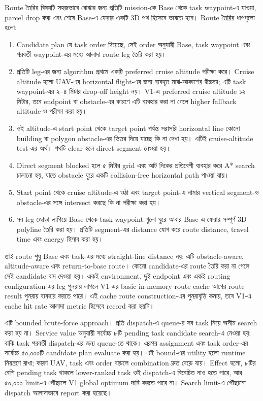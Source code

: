\documentclass[10pt,a4paper]{article}
\begin{document}
Route তৈরির বিষয়টি সহজভাবে বোঝার জন্য প্রতিটি mission-কে Base থেকে task waypoint-এ যাওয়া, parcel drop করা এবং শেষে Base-এ ফেরার একটি 3D পথ হিসেবে ভাবতে হবে। Route তৈরির ধাপগুলো হলো:

\begin{enumerate}
\item Candidate plan যে task order দিয়েছে, সেই order অনুযায়ী Base, task waypoint এবং পরবর্তী waypoint-এর মধ্যে আলাদা route leg তৈরি করা হয়।
\item প্রতিটি leg-এর জন্য algorithm প্রথমে একটি preferred cruise altitude পরীক্ষা করে। Cruise altitude হলো UAV-এর horizontal flight-এর জন্য ব্যবহৃত মাঝ-আকাশের উচ্চতা; এটি task waypoint-এর ২--৪ মিটার drop-off height নয়। V1-এ preferred cruise altitude ১২ মিটার, তবে endpoint বা obstacle-এর কারণে এটি ব্যবহার করা না গেলে higher fallback altitude-ও পরীক্ষা করা হয়।
\item ওই altitude-এ start point থেকে target point পর্যন্ত সরাসরি horizontal line কোনো building বা polygon obstacle-এর ভিতর দিয়ে যাচ্ছে কি না দেখা হয়। এটিই cruise-altitude test-এর অর্থ। পথটি clear হলে direct segment নেওয়া হয়।
\item Direct segment blocked হলে ৫ মিটার grid এবং আট দিকের প্রতিবেশী ব্যবহার করে A* search চালানো হয়, যাতে obstacle ঘুরে একটি collision-free horizontal path পাওয়া যায়।
\item Start point থেকে cruise altitude-এ ওঠা এবং target point-এ নামার vertical segment-ও obstacle-এর সঙ্গে intersect করছে কি না পরীক্ষা করা হয়।
\item সব leg জোড়া লাগিয়ে Base থেকে task waypoint-গুলো ঘুরে আবার Base-এ ফেরার সম্পূর্ণ 3D polyline তৈরি করা হয়। প্রতিটি segment-এর distance যোগ করে route distance, travel time এবং energy হিসাব করা হয়।
\end{enumerate}

তাই route শুধু Base এবং task-এর মধ্যে straight-line distance নয়; এটি obstacle-aware, altitude-aware এবং return-to-base route। কোনো candidate-এর route তৈরি করা না গেলে সেই candidate বাদ দেওয়া হয়। একই environment, দুই endpoint এবং একই routing configuration-এর leg পুনরায় লাগলে V1-এর basic in-memory route cache আগের route result পুনরায় ব্যবহার করতে পারে। এই cache route construction-এর পুনরাবৃত্তি কমায়, তবে V1-এ cache hit rate আলাদা metric হিসেবে record করা হয়নি।

এটি bounded brute-force approach। প্রতি dispatch-এ queue-র সব task নিয়ে অসীম search করা হয় না। Service value অনুযায়ী সর্বোচ্চ ৮টি pending task candidate search-এ নেওয়া হয়; বাকি task পরবর্তী dispatch-এর জন্য queue-তে থাকে। এরপর assignment এবং task order-এর সর্বোচ্চ ৫০,০০০টি candidate plan evaluate করা হয়। এই bound-এর utility হলো runtime নিয়ন্ত্রণে রাখা; কারণ UAV, task এবং order বাড়লে combination দ্রুত বেড়ে যায়। Effect হলো, ৮টির বেশি pending task থাকলে lower-ranked task ওই dispatch-এ বিবেচিত নাও হতে পারে, আর ৫০,০০০ limit-এ পৌঁছালে V1 global optimum দাবি করতে পারে না। Search limit-এ পৌঁছানো dispatch আলাদাভাবে report করা হয়েছে।
\end{document}

